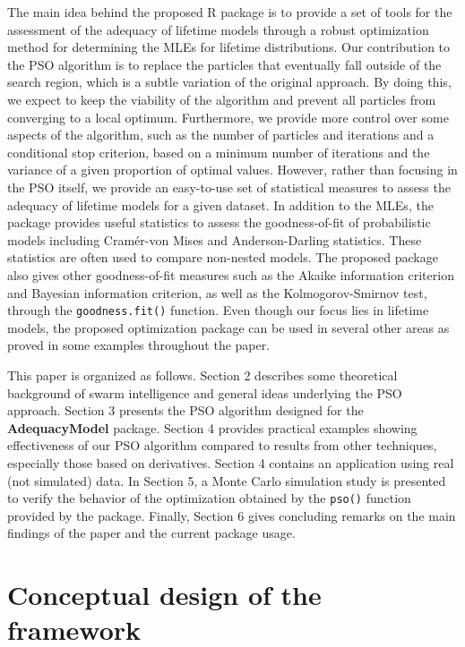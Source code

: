 \documentclass[10pt,letterpaper]{article}
\begin{document}
The main idea behind the proposed \textsc{R} package is to provide a set of tools for the assessment of the adequacy of
lifetime models through a robust optimization method for determining the MLEs for lifetime distributions.
Our contribution to the PSO algorithm is to replace the particles that eventually fall outside of the search region, which is a subtle variation of the original approach.
By doing this, we expect to keep the viability of the algorithm and prevent all particles from converging to a local optimum.
Furthermore, we provide more control over some aspects of the algorithm, such as the number of particles and iterations and a conditional stop criterion,
based on a minimum number of iterations and the variance of a given proportion of optimal values.
However, rather than focusing in the PSO itself, we provide an easy-to-use set of statistical measures to assess
the adequacy of lifetime models for a given dataset.
In addition to the MLEs, the package provides  useful statistics to assess the goodness-of-fit of probabilistic models
including Cramér-von Mises and Anderson-Darling statistics.
These statistics are often used to compare non-nested models.
The proposed package also gives other goodness-of-fit measures such as the Akaike information criterion and Bayesian information criterion, as well as the Kolmogorov-Smirnov test, through the \texttt{goodness.fit()} function.
Even  though our focus lies in lifetime models, the proposed optimization package can be used in several other areas as proved in some examples throughout the paper.


This paper is organized as follows.
Section 2 describes some theoretical background of swarm intelligence
and general ideas underlying the PSO approach.
Section 3 presents the PSO algorithm designed for the \textbf{AdequacyModel} package.
Section 4 provides practical examples  showing  effectiveness of our PSO algorithm compared to results from other techniques, especially those based on derivatives.
Section 4 contains an application using real (not simulated) data.
In Section 5, a Monte Carlo simulation study is presented to verify the behavior of the optimization obtained by the \texttt{pso()} function provided by the package.
Finally, Section 6 gives concluding remarks on the main findings of the paper and the current package usage.



\section{Conceptual design of the framework}
\label{pso}
\end{document}

